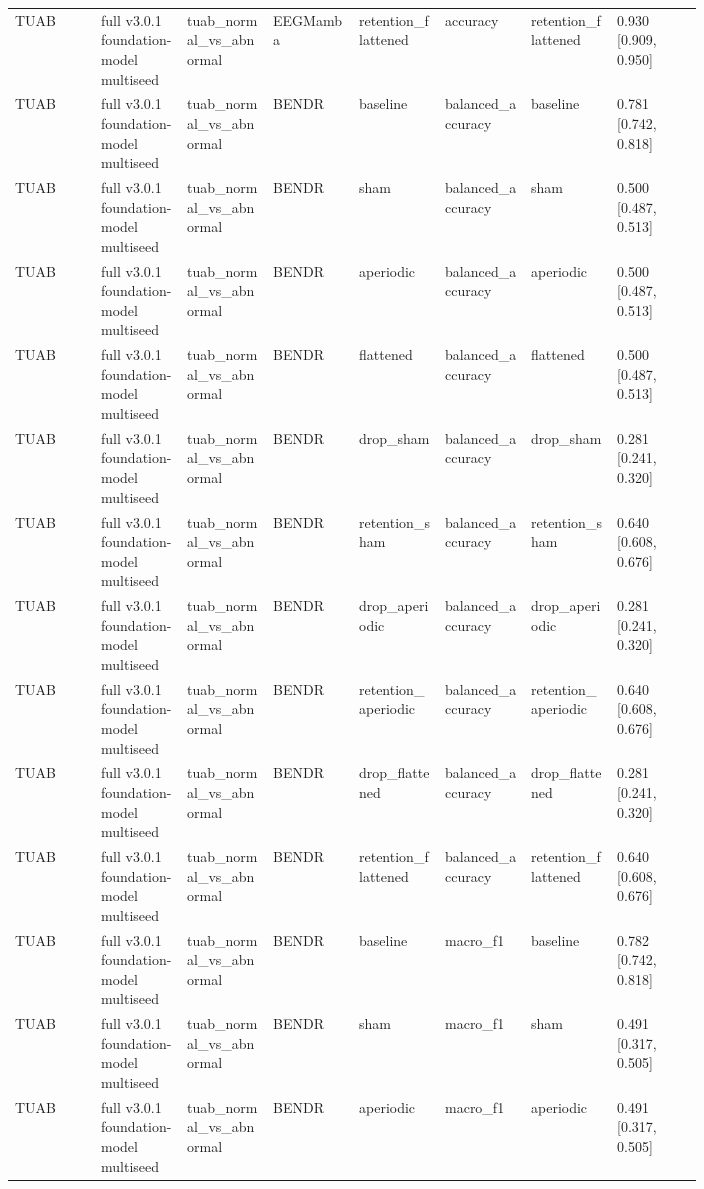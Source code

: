 \begin{longtable}{p{0.10\linewidth}p{0.10\linewidth}p{0.10\linewidth}p{0.10\linewidth}p{0.10\linewidth}p{0.10\linewidth}p{0.10\linewidth}p{0.10\linewidth}}
TUAB & full v3.0.1 foundation-model multiseed & tuab\_normal\_vs\_abnormal & EEGMamba & retention\_flattened & accuracy & retention\_flattened & 0.930 [0.909, 0.950]\\
TUAB & full v3.0.1 foundation-model multiseed & tuab\_normal\_vs\_abnormal & BENDR & baseline & balanced\_accuracy & baseline & 0.781 [0.742, 0.818]\\
TUAB & full v3.0.1 foundation-model multiseed & tuab\_normal\_vs\_abnormal & BENDR & sham & balanced\_accuracy & sham & 0.500 [0.487, 0.513]\\
TUAB & full v3.0.1 foundation-model multiseed & tuab\_normal\_vs\_abnormal & BENDR & aperiodic & balanced\_accuracy & aperiodic & 0.500 [0.487, 0.513]\\
TUAB & full v3.0.1 foundation-model multiseed & tuab\_normal\_vs\_abnormal & BENDR & flattened & balanced\_accuracy & flattened & 0.500 [0.487, 0.513]\\
TUAB & full v3.0.1 foundation-model multiseed & tuab\_normal\_vs\_abnormal & BENDR & drop\_sham & balanced\_accuracy & drop\_sham & 0.281 [0.241, 0.320]\\
TUAB & full v3.0.1 foundation-model multiseed & tuab\_normal\_vs\_abnormal & BENDR & retention\_sham & balanced\_accuracy & retention\_sham & 0.640 [0.608, 0.676]\\
TUAB & full v3.0.1 foundation-model multiseed & tuab\_normal\_vs\_abnormal & BENDR & drop\_aperiodic & balanced\_accuracy & drop\_aperiodic & 0.281 [0.241, 0.320]\\
TUAB & full v3.0.1 foundation-model multiseed & tuab\_normal\_vs\_abnormal & BENDR & retention\_aperiodic & balanced\_accuracy & retention\_aperiodic & 0.640 [0.608, 0.676]\\
TUAB & full v3.0.1 foundation-model multiseed & tuab\_normal\_vs\_abnormal & BENDR & drop\_flattened & balanced\_accuracy & drop\_flattened & 0.281 [0.241, 0.320]\\
TUAB & full v3.0.1 foundation-model multiseed & tuab\_normal\_vs\_abnormal & BENDR & retention\_flattened & balanced\_accuracy & retention\_flattened & 0.640 [0.608, 0.676]\\
TUAB & full v3.0.1 foundation-model multiseed & tuab\_normal\_vs\_abnormal & BENDR & baseline & macro\_f1 & baseline & 0.782 [0.742, 0.818]\\
TUAB & full v3.0.1 foundation-model multiseed & tuab\_normal\_vs\_abnormal & BENDR & sham & macro\_f1 & sham & 0.491 [0.317, 0.505]\\
TUAB & full v3.0.1 foundation-model multiseed & tuab\_normal\_vs\_abnormal & BENDR & aperiodic & macro\_f1 & aperiodic & 0.491 [0.317, 0.505]\\

\end{longtable}
